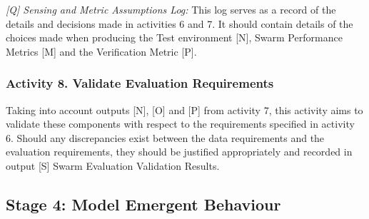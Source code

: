 \documentclass[runningheads]{llncs}
\begin{document}
\emph{[Q] Sensing and Metric Assumptions Log:} This log serves as a record of the details and decisions made in activities 6 and 7. It should contain details of the choices made when producing the Test environment [N], Swarm Performance Metrics [M] and the Verification Metric [P].

\subsubsection*{Activity 8. Validate Evaluation Requirements}

Taking into account outputs [N], [O] and [P] from activity 7, this activity aims to validate these components with respect to the requirements specified in activity 6. Should any discrepancies exist between the data requirements and the evaluation requirements, they should be justified appropriately and recorded in output [S] Swarm Evaluation Validation Results.

\subsection{Stage 4: Model Emergent Behaviour} \label{framework-stage4}


\end{document}
